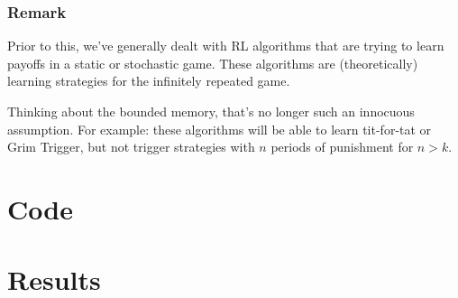 \documentclass{beamer}
\begin{document}
\begin{frame}\frametitle{Remark}
	Prior to this, we've generally dealt with RL algorithms that are trying to learn \alert{payoffs} in a static or stochastic game. These algorithms are (theoretically) learning \alert{strategies} for the infinitely repeated game. 
	
	Thinking about the bounded memory, that's no longer such an innocuous assumption. For example: these algorithms will be able to learn tit-for-tat or Grim Trigger, but not trigger strategies with $n$ periods of punishment for $n > k$.
\end{frame}


\section{Code}


\section{Results}






























	
\end{document}
